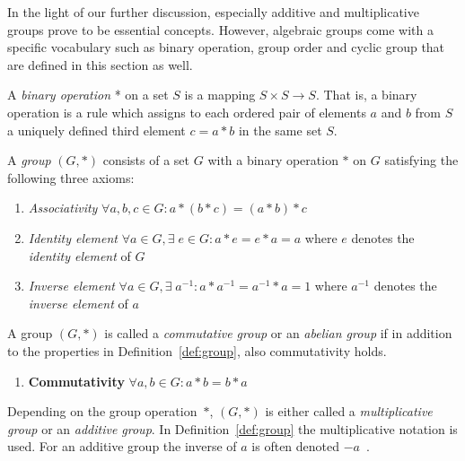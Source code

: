 In the light of our further discussion, especially additive and multiplicative groups prove to be essential concepts. However, algebraic groups come with a specific vocabulary such as binary operation, group order and cyclic group that are defined in this section as well.

\begin{defn}
 A \textit{binary operation} * on a set $S$ is a mapping $S \times S \rightarrow S$. That is, a binary operation is a rule which assigns to each ordered pair of elements $a$ and $b$ from $S$ a uniquely defined third element $c = a*b$ in the same set $S$.~\cite{book:survey_of_modern_algebra,book:handbook_of_applied_cryptography}
\end{defn}

\begin{defn}[Group]
\label{def:group}
 A \textit{group} $\left( G, * \right)$ consists of a set $G$ with a binary operation $*$ on $G$ satisfying the following three axioms:
 \begin{enumerate}
  \item \textit{Associativity} $\forall a, b, c \in G: a*(b*c) = (a*b)*c$
  \item \textit{Identity element} $\forall a \in G, \exists \; e \in G: a*e = e*a = a $ where $e$ denotes the \textit{identity element} of $G$
  \item \textit{Inverse element} $\forall a \in G, \exists \; a^{-1}: a*a^{-1} = a^{-1}*a = 1$ where $a^{-1}$ denotes the \textit{inverse element} of $a$
  \setcounter{enumTemp}{\theenumi}
 \end{enumerate}

\end{defn}

\begin{defn}
 A group $\left( G, * \right)$ is called a \textit{commutative group} or an \textit{abelian group} if in addition to the properties in Definition~\ref{def:group}, also commutativity holds.
 \begin{enumerate}
  \setcounter{enumi}{\theenumTemp}
  \item \textbf{Commutativity} $\forall a, b \in G: a*b = b*a$
 \end{enumerate}

\end{defn}

Depending on the group operation~$*$, $\left( G, * \right)$ is either called a \textit{multiplicative group} or an \textit{additive group}. In Definition~\ref{def:group} the multiplicative notation is used. For an additive group  the inverse of $a$ is often denoted $- a$~\cite{book:handbook_of_applied_cryptography}. 

